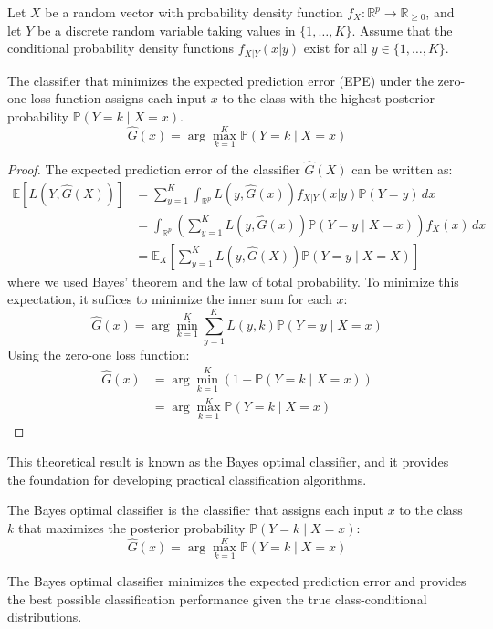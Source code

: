 \begin{theorem}
Let $X$ be a random vector with probability density function $f_X: \mathbb{R}^p \to \mathbb{R}_{\geq 0}$, and let $Y$ be a discrete random variable taking values in $\{1,\ldots,K\}$. Assume that the conditional probability density functions $f_{X|Y}(x|y)$ exist for all $y \in \{1,\ldots,K\}$.

The classifier that minimizes the expected prediction error (EPE) under the zero-one loss function assigns each input $x$ to the class with the highest posterior probability $\mathbb{P}(Y = k \mid X = x)$.
\[
\hat{G}(x) = \arg\max_{k=1}^K \mathbb{P}(Y = k \mid X = x)
\]
\end{theorem}

\begin{proof}
The expected prediction error of the classifier $\hat{G}(X)$ can be written as:
\begin{align*}
\mathbb{E}[L(Y, \hat{G}(X))] & = \sum_{y=1}^K \int_{\mathbb{R}^{p}} L(y, \hat{G}(x)) f_{X|Y}(x|y)\mathbb{P}(Y=y)\, dx \\
& = \int_{\mathbb{R}^{p}} \left( \sum_{y=1}^K L(y, \hat{G}(x)) \mathbb{P}(Y = y \mid X = x) \right) f_X(x) \, dx \\
& = \mathbb{E}_X\left[ \sum_{y=1}^K L(y, \hat{G}(X)) \mathbb{P}(Y = y \mid X = X) \right]
\end{align*}
where we used Bayes' theorem and the law of total probability. To minimize this expectation, it suffices to minimize the inner sum for each $x$:
\[
\hat{G}(x) = \arg\min_{k=1}^K \sum_{y=1}^K L(y, k) \mathbb{P}(Y = y \mid X = x)
\]
Using the zero-one loss function:
\begin{align*}
\hat{G}(x) & = \arg\min_{k=1}^K \left(1 - \mathbb{P}(Y = k \mid X = x)\right) \\
& = \arg\max_{k=1}^K \mathbb{P}(Y = k \mid X = x)
\end{align*}
\end{proof}

This theoretical result is known as the Bayes optimal classifier, and it provides the foundation for developing practical classification algorithms.

\begin{definition}
The Bayes optimal classifier is the classifier that assigns each input $x$ to the class $k$ that maximizes the posterior probability $\mathbb{P}(Y = k \mid X = x)$:
\[
\hat{G}(x) = \arg\max_{k=1}^K \mathbb{P}(Y = k \mid X = x)
\]
\end{definition}
The Bayes optimal classifier minimizes the expected prediction error and provides the best possible classification performance given the true class-conditional distributions.

